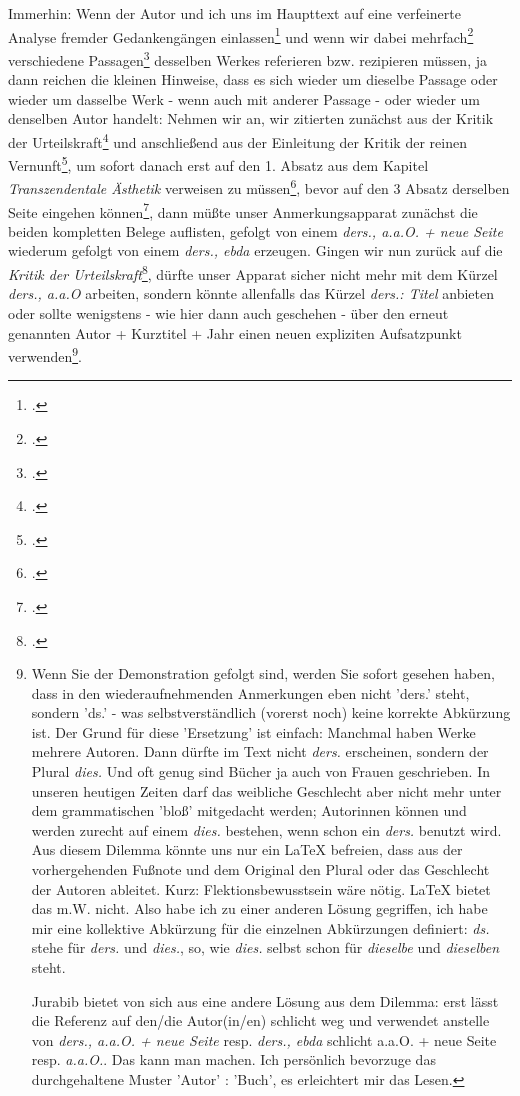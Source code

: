 Immerhin: Wenn der Autor und ich uns im Haupttext auf eine verfeinerte Analyse
fremder Gedankengängen einlassen\footcite[vgl. etwa][32]{Allen2001a} und wenn
wir dabei mehrfach\footcite[vgl.][139]{Allen2001a} verschiedene
Passagen\footcite[vgl.][139]{Allen2001a} desselben Werkes referieren bzw.
rezipieren müssen, ja dann reichen die kleinen Hinweise, dass es sich wieder um
dieselbe Passage oder wieder um dasselbe Werk - wenn auch mit anderer Passage -
oder wieder um denselben Autor handelt: Nehmen wir an, wir zitierten zunächst aus
der Kritik der Urteilskraft\footcite[vgl.][9]{KantKdU1974} und anschließend aus
der Einleitung der Kritik der reinen Vernunft\footcite[vgl.][45]{KantKdV1974},
um sofort danach erst auf den 1. Absatz aus dem Kapitel \emph{Transzendentale
Ästhetik} verweisen zu müssen\footcite[vgl.][69]{KantKdV1974}, bevor auf den 3
Absatz derselben Seite eingehen können\footcite[vgl.][69]{KantKdV1974}, dann
müßte unser Anmerkungsapparat zunächst die beiden kompletten Belege auflisten,
gefolgt von einem \emph{ders., a.a.O. + neue Seite} wiederum gefolgt von einem
\emph{ders., ebda} erzeugen. Gingen wir nun zurück auf die \emph{Kritik der
Urteilskraft}\footcite[vgl.][9]{KantKdU1974}, dürfte unser Apparat sicher nicht
mehr mit dem Kürzel \emph{ders., a.a.O} arbeiten, sondern könnte allenfalls das
Kürzel \emph{ders.: Titel} anbieten oder sollte wenigstens - wie hier dann auch
geschehen - über den erneut genannten Autor + Kurztitel + Jahr einen neuen
expliziten Aufsatzpunkt verwenden\footnote{Wenn Sie der Demonstration gefolgt
sind, werden Sie sofort gesehen haben, dass in den wiederaufnehmenden
Anmerkungen eben nicht 'ders.' steht, sondern 'ds.' - was selbstverständlich
(vorerst noch) keine korrekte Abkürzung ist. Der Grund für diese 'Ersetzung' ist
einfach: Manchmal haben Werke mehrere Autoren. Dann dürfte im Text nicht
{\itshape ders.} erscheinen, sondern der Plural {\itshape dies.} Und oft genug
sind Bücher ja auch von Frauen geschrieben. In unseren heutigen Zeiten darf das
weibliche Geschlecht aber nicht mehr unter dem grammatischen 'bloß' mitgedacht
werden; Autorinnen können und werden zurecht auf einem {\itshape dies.}
bestehen, wenn schon ein {\itshape ders.} benutzt wird. Aus diesem Dilemma
könnte uns nur ein LaTeX befreien, dass aus der vorhergehenden Fußnote und dem
Original den Plural oder das Geschlecht der Autoren ableitet. Kurz:
Flektionsbewusstsein wäre nötig. LaTeX bietet das m.W. nicht. Also habe ich zu
einer anderen Lösung gegriffen, ich habe mir eine kollektive Abkürzung für die
einzelnen Abkürzungen definiert: {\itshape ds.} stehe für {\itshape ders.} und
{\itshape dies.}, so, wie {\itshape dies.} selbst schon für {\itshape dieselbe}
und {\itshape dieselben} steht.

Jurabib bietet von sich aus eine andere Lösung aus dem Dilemma: erst lässt die
Referenz auf den/die Autor(in/en) schlicht weg und verwendet anstelle von
{\itshape ders., a.a.O. + neue Seite} resp. {\itshape ders., ebda} schlicht
{a.a.O. + neue Seite} resp. {\itshape a.a.O.}. Das kann man machen. Ich
persönlich bevorzuge das durchgehaltene Muster 'Autor' : 'Buch', es erleichtert
mir das Lesen.}.

